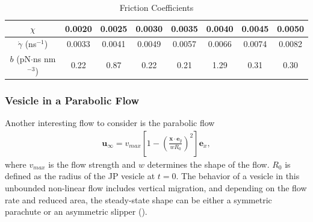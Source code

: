 \documentclass[lineno]{jfm}
\newcommand{\xx}{\mathbf{x}}
\newcommand{\uu}{\mathbf{u}}
\begin{document}
\begin{table}
\caption{Friction Coefficients}
\centering
\begin{tabular}{c c c c c c c c }
 $\chi$ & 0.0020   &  0.0025 &  0.0030 &  0.0035 &  0.0040 & 0.0045 & 0.0050  \\
\hline                    
$\dot\gamma$ (ns$^{-1}$)        & 0.0033 & 0.0041 & 0.0049 & 0.0057 & 0.0066 & 0.0074 & 0.0082\\
$b$ (pN$\cdot$ns nm$^{-3}$)    & 0.22 & 0.87  & 0.22 &0.21 & 1.29 & 0.31 & 0.30\\ 
\hline    
\end{tabular} 
\label{table1}
\end{table}


\subsubsection{Vesicle in a Parabolic Flow}
Another interesting flow to consider is the parabolic flow
\begin{align}
  \uu_\infty = v_{max}\left[ 1 - \left( 
    \frac{\xx \cdot \mathbf{e}_y}{wR_0}\right)^2
    \right]\mathbf{e}_x,
\end{align}
%
where $v_{max}$ is the flow strength and $w$ determines the shape of the
flow. $R_0$ is defined as the radius of the JP vesicle at $t=0$. The
behavior of a vesicle in this unbounded non-linear flow includes
vertical migration, and depending on the flow rate and reduced area, the
steady-state shape can be either a symmetric parachute or an asymmetric
slipper (\cite{Kaoui09, cou-kao-pod-mis2008, dan-vla-mis2009}).

\end{document}
